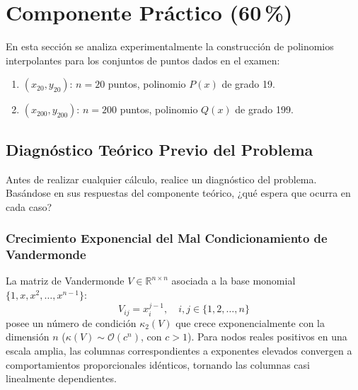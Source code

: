 \documentclass[11pt,a4paper]{article}
\theoremstyle{definition}
\theoremstyle{remark}
\begin{document}
\newpage

\section{Componente Práctico (60\,\%)}

En esta sección se analiza experimentalmente la construcción de polinomios interpolantes para los conjuntos de puntos dados en el examen:
\begin{enumerate}
    \item $(x_{20}, y_{20})$: $n = 20$ puntos, polinomio $P(x)$ de grado 19.
    \item $(x_{200}, y_{200})$: $n = 200$ puntos, polinomio $Q(x)$ de grado 199.
\end{enumerate}

\subsection{Diagnóstico Teórico Previo del Problema}

\begin{solbox}
Antes de realizar cualquier cálculo, realice un diagnóstico del problema. Basándose en sus respuestas del componente teórico, ¿qué espera que ocurra en cada caso?
\end{solbox}

\subsubsection{Crecimiento Exponencial del Mal Condicionamiento de Vandermonde}
La matriz de Vandermonde $V \in \mathbb{R}^{n \times n}$ asociada a la base monomial $\{1, x, x^2, \dots, x^{n-1}\}$:
\begin{equation}
    V_{ij} = x_i^{j-1}, \quad i, j \in \{1, 2, \dots, n\}
\end{equation}
posee un número de condición $\kappa_2(V)$ que crece exponencialmente con la dimensión $n$ ($\kappa(V) \sim \mathcal{O}(c^n)$, con $c > 1$). Para nodos reales positivos en una escala amplia, las columnas correspondientes a exponentes elevados convergen a comportamientos proporcionales idénticos, tornando las columnas casi linealmente dependientes.
\end{document}
